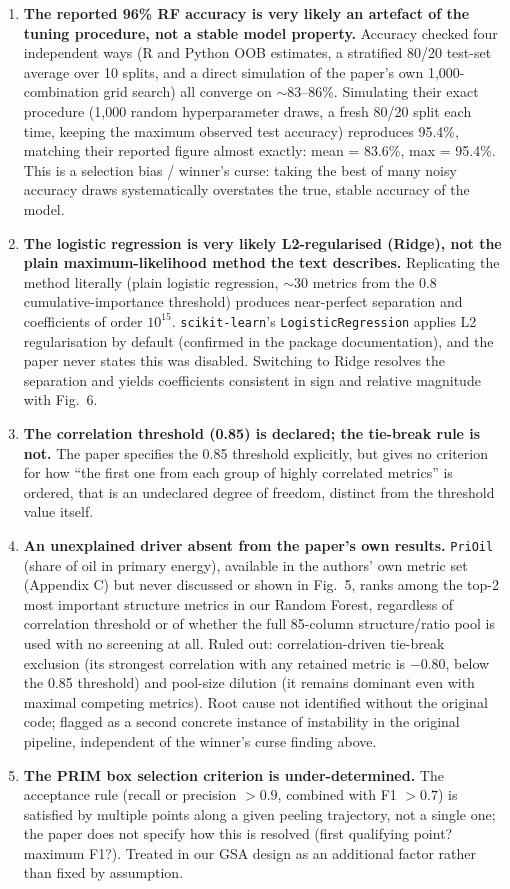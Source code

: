 \documentclass[sn-basic]{sn-jnl}%
\begin{document}
\begin{enumerate}
	\item \textbf{The reported 96\% RF accuracy is very likely an artefact of the tuning procedure, not a stable model property.} Accuracy checked four independent ways (R and Python OOB estimates, a stratified 80/20 test-set average over 10 splits, and a direct simulation of the paper's own 1,000-combination grid search) all converge on $\sim$83--86\%. Simulating their exact procedure (1,000 random hyperparameter draws, a fresh 80/20 split each time, keeping the maximum observed test accuracy) reproduces 95.4\%, matching their reported figure almost exactly: mean = 83.6\%, max = 95.4\%. This is a selection bias / winner's curse: taking the best of many noisy accuracy draws systematically overstates the true, stable accuracy of the model.
	\item \textbf{The logistic regression is very likely L2-regularised (Ridge), not the plain maximum-likelihood method the text describes.}
	Replicating the method literally (plain logistic regression, $\sim$30 metrics from the 0.8 cumulative-importance threshold) produces
	near-perfect separation and coefficients of order $10^{15}$. \texttt{scikit-learn}'s \texttt{LogisticRegression} applies L2
	regularisation by default (confirmed in the package documentation), and the paper never states this was disabled. Switching to Ridge resolves the
	separation and yields coefficients consistent in sign and relative magnitude with Fig.~6.
	\item \textbf{The correlation threshold (0.85) is declared; the tie-break rule is not.} The paper specifies the 0.85 threshold explicitly, but gives no criterion for how ``the first one from each group of highly correlated metrics'' is ordered, that is an undeclared degree of freedom, distinct from the threshold value itself.
	\item \textbf{An unexplained driver absent from the paper's own results.} \texttt{PriOil} (share of oil in primary energy), available in the
	authors' own metric set (Appendix C) but never discussed or shown in Fig.~5,  ranks among the top-2 most important structure metrics in our Random Forest, regardless of correlation threshold or of whether the full 85-column structure/ratio pool is used with no screening 	at all. Ruled out: correlation-driven tie-break exclusion (its strongest correlation with any retained metric is $-0.80$, below the 0.85 threshold) and pool-size dilution (it remains dominant even with maximal
	competing metrics). Root cause not identified without the original code; flagged as a second concrete instance of instability in the original
	pipeline, independent of the winner's curse finding above.
	\item \textbf{The PRIM box selection criterion is under-determined.} The acceptance rule (recall or precision $>0.9$, combined with F1 $>0.7$) is satisfied by multiple points along a given peeling trajectory, not a single one; the paper does not specify how this is resolved (first qualifying point? maximum F1?). Treated in our GSA design as an additional factor rather than fixed by assumption.
\end{enumerate}
\end{document}
